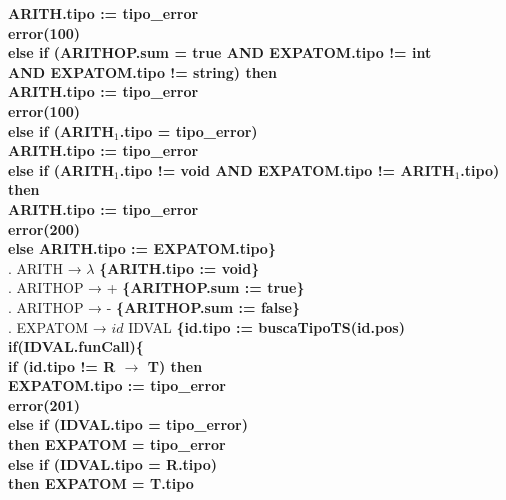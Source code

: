 \begin{tabbing}
    \>              \>          \> \textbf{ARITH.tipo := tipo\_error}\\
    \>              \>          \> \textbf{error(100)}\\
    \>              \>\textbf{else if (ARITHOP.sum = true AND EXPATOM.tipo != int}\\
    \>              \>          \>\textbf{AND EXPATOM.tipo != string) then}\\
    \>              \>          \>      \> \textbf{ARITH.tipo := tipo\_error}\\
    \>              \>          \>      \> \textbf{error(100)}\\
    \>              \> \textbf{else if (ARITH$_1$.tipo = tipo\_error)}\\
    \>              \>          \> \textbf{ARITH.tipo := tipo\_error}\\
    \>              \> \textbf{else if (ARITH$_1$.tipo != void AND EXPATOM.tipo != ARITH$_1$.tipo) then}\\
    \>              \>          \> \textbf{ARITH.tipo := tipo\_error}\\
    \>              \>          \> \textbf{error(200)}\\
    \>              \> \textbf{else ARITH.tipo := EXPATOM.tipo\}}\\
    . ARITH → $\lambda$ \textbf{\{ARITH.tipo := void\}}\\
    . ARITHOP → + \textbf{\{ARITHOP.sum := true\}}\\
    . ARITHOP → - \textbf{\{ARITHOP.sum := false\}}\\
    . EXPATOM → $id$ IDVAL \textbf{\{id.tipo := buscaTipoTS(id.pos)}\\
    \>              \> \textbf{if(IDVAL.funCall)\{}\\
    \>              \>          \> \textbf{if (id.tipo != R $\rightarrow$ T) then}\\
    \>              \>          \>      \> \textbf{EXPATOM.tipo := tipo\_error}\\
    \>              \>          \>      \> \textbf{error(201)}\\
    \>              \>          \> \textbf{else if (IDVAL.tipo = tipo\_error)}\\
    \>              \>          \>      \> \textbf{then EXPATOM = tipo\_error}\\
    \>              \>          \> \textbf{else if (IDVAL.tipo = R.tipo)}\\
    \>              \>          \>      \> \textbf{then EXPATOM = T.tipo}\\

\end{tabbing}
